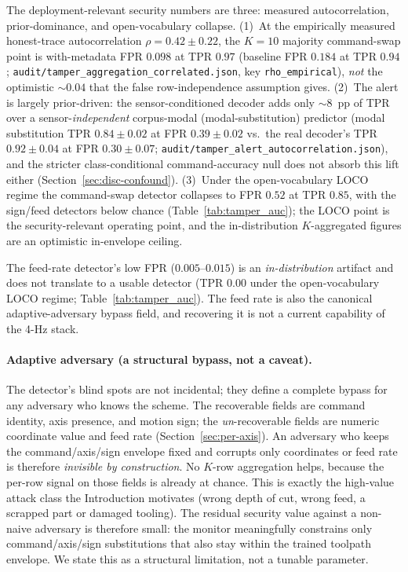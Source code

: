 \documentclass[sensors,article,submit,moreauthors,pdftex]{Definitions/mdpi}
\begin{document}
The deployment-relevant security numbers are three: measured autocorrelation, prior-dominance, and open-vocabulary collapse. (1)~At the empirically measured honest-trace autocorrelation $\rho\!=\!0.42 \pm 0.22$, the $K\!=\!10$ majority command-swap point is with-metadata FPR $0.098$ at TPR $0.97$ (baseline FPR $0.184$ at TPR $0.94$; \texttt{audit/tamper\_aggregation\_correlated.json}, key \texttt{rho\_empirical}), \emph{not} the optimistic $\sim\!0.04$ that the false row-independence assumption gives. (2)~The alert is largely prior-driven: the sensor-conditioned decoder adds only $\sim\!8$~pp of TPR over a sensor-\emph{independent} corpus-modal (modal-substitution) predictor (modal substitution TPR $0.84 \pm 0.02$ at FPR $0.39 \pm 0.02$ vs.\ the real decoder's TPR $0.92 \pm 0.04$ at FPR $0.30 \pm 0.07$; \texttt{audit/tamper\_alert\_autocorrelation.json}), and the stricter class-conditional command-accuracy null does not absorb this lift either (Section~\ref{sec:disc-confound}). (3)~Under the open-vocabulary LOCO regime the command-swap detector collapses to FPR $0.52$ at TPR $0.85$, with the sign/feed detectors below chance (Table~\ref{tab:tamper_auc}); the LOCO point is the security-relevant operating point, and the in-distribution $K$-aggregated figures are an optimistic in-envelope ceiling.

The feed-rate detector's low FPR ($0.005$--$0.015$) is an \emph{in-distribution} artifact and does not translate to a usable detector (TPR $0.00$ under the open-vocabulary LOCO regime; Table~\ref{tab:tamper_auc}). The feed rate is also the canonical adaptive-adversary bypass field, and recovering it is not a current capability of the 4-Hz stack.

\paragraph{Adaptive adversary (a structural bypass, not a caveat).} The detector's blind spots are not incidental; they define a complete bypass for any adversary who knows the scheme. The recoverable fields are command identity, axis presence, and motion sign; the \emph{un}-recoverable fields are numeric coordinate value and feed rate (Section~\ref{sec:per-axis}). An adversary who keeps the command/axis/sign envelope fixed and corrupts only coordinates or feed rate is therefore \emph{invisible by construction}. No $K$-row aggregation helps, because the per-row signal on those fields is already at chance. This is exactly the high-value attack class the Introduction motivates (wrong depth of cut, wrong feed, a scrapped part or damaged tooling). The residual security value against a non-naive adversary is therefore small: the monitor meaningfully constrains only command/axis/sign substitutions that also stay within the trained toolpath envelope. We state this as a structural limitation, not a tunable parameter.
\end{document}
